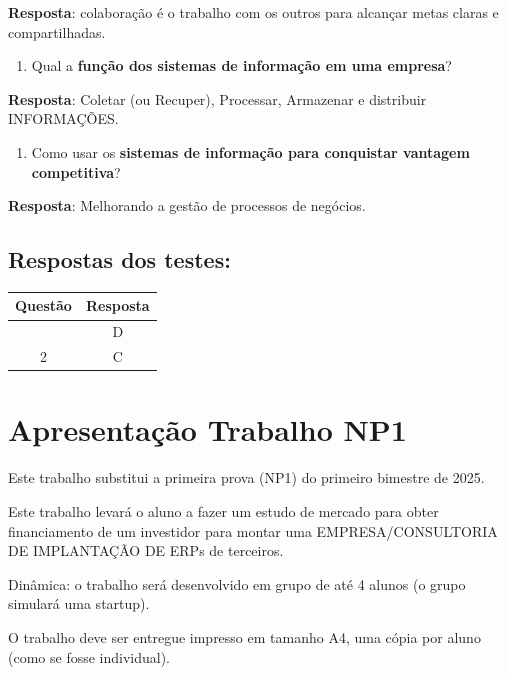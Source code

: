 \documentclass[
]{book}
\providecommand{\tightlist}{%
  \setlength{\itemsep}{0pt}\setlength{\parskip}{0pt}}
\begin{document}
\textbf{Resposta}: colaboração é o trabalho com os outros para alcançar metas claras e compartilhadas.

\begin{enumerate}
\def\labelenumi{\arabic{enumi}.}
\setcounter{enumi}{11}
\tightlist
\item
  Qual a \textbf{função dos sistemas de informação em uma empresa}?
\end{enumerate}

\textbf{Resposta}: Coletar (ou Recuper), Processar, Armazenar e distribuir INFORMAÇÕES.

\begin{enumerate}
\def\labelenumi{\arabic{enumi}.}
\setcounter{enumi}{12}
\tightlist
\item
  Como usar os \textbf{sistemas de informação para conquistar vantagem competitiva}?
\end{enumerate}

\textbf{Resposta}: Melhorando a gestão de processos de negócios.

\section{Respostas dos testes:}\label{respostas-dos-testes}

\begin{longtable}[]{@{}cc@{}}
\toprule\noalign{}
Questão & Resposta \\
\midrule\noalign{}
\endhead
\bottomrule\noalign{}
\endlastfoot
1 & D \\
2 & C \\
\end{longtable}

\chapter{Apresentação Trabalho NP1}\label{apresentauxe7uxe3o-trabalho-np1}

Este trabalho substitui a primeira prova (NP1) do primeiro bimestre de 2025.

Este trabalho levará o aluno a fazer um estudo de mercado para obter financiamento de um investidor para montar uma EMPRESA/CONSULTORIA DE IMPLANTAÇÃO DE ERPs de terceiros.

Dinâmica: o trabalho será desenvolvido em grupo de até 4 alunos (o grupo simulará uma startup).

O trabalho deve ser entregue impresso em tamanho A4, uma cópia por aluno (como se fosse individual).
\end{document}
